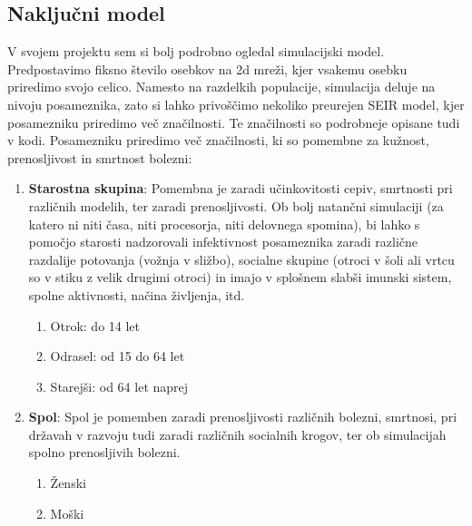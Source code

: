 \documentclass[a4paper, 11pt]{article}
\begin{document}
\subsection*{Naključni model}
V svojem projektu sem si bolj podrobno ogledal simulacijski model. Predpostavimo fiksno število osebkov na 2d mreži, kjer vsakemu osebku priredimo svojo celico. Namesto na razdelkih populacije, simulacija deluje na nivoju posameznika, zato si lahko privoščimo nekoliko preurejen SEIR model, kjer posamezniku priredimo več značilnosti. Te značilnosti so podrobneje opisane tudi v kodi. Posamezniku priredimo več značilnosti, ki so pomembne za kužnost, prenosljivost in smrtnost bolezni:
\begin{enumerate}
\item \textbf{Starostna skupina}: Pomembna je zaradi učinkovitosti cepiv, smrtnosti pri različnih modelih, ter zaradi prenosljivosti. Ob bolj natančni simulaciji (za katero ni niti časa, niti procesorja, niti delovnega spomina), bi lahko s pomočjo starosti nadzorovali infektivnost posameznika zaradi različne razdalije potovanja (vožnja v sližbo), socialne skupine (otroci v šoli ali vrtcu so v stiku z velik drugimi otroci) in imajo v splošnem slabši imunski sistem, spolne aktivnosti, načina življenja, itd.
\begin{enumerate}
\item Otrok: do 14 let
\item Odrasel: od 15 do 64 let
\item Starejši: od 64 let naprej
\end{enumerate}

\item \textbf{Spol}: Spol je pomemben zaradi prenosljivosti različnih bolezni, smrtnosi, pri državah v razvoju tudi zaradi različnih socialnih krogov, ter ob simulacijah spolno prenosljivih bolezni.
\begin{enumerate}
\item Ženski
\item Moški
\end{enumerate}


\end{enumerate}
\end{document}
